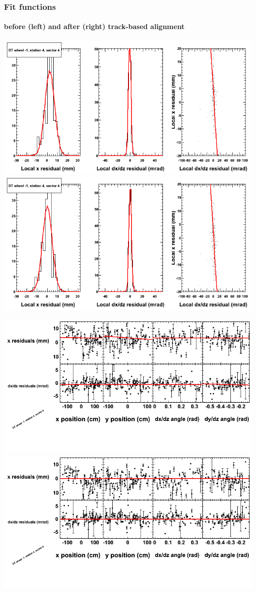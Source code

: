 \documentclass[compress]{beamer}
\begin{document}
\begin{frame}
\frametitle{Fit functions}
\framesubtitle{before (left) and after (right) track-based alignment}
\includegraphics[width=0.5\linewidth]{fitfunctions_re01/MBwhBst4sec04_bellcurves.png} \includegraphics[width=0.5\linewidth]{fitfunctions_re05/MBwhBst4sec04_bellcurves.png}

\includegraphics[width=0.5\linewidth]{fitfunctions_re01/MBwhBst4sec04_polynomials.png} \includegraphics[width=0.5\linewidth]{fitfunctions_re05/MBwhBst4sec04_polynomials.png}
\end{frame}
\end{document}
